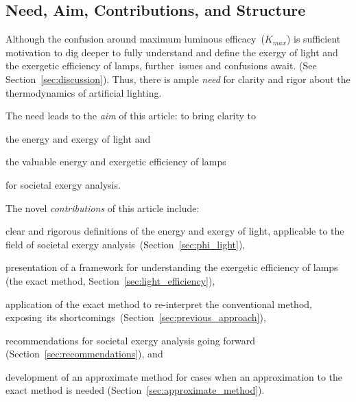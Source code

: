 \documentclass[energies,article,accept,moreauthors,pdftex]{Definitions/mdpi}\usepackage[]{graphicx}\usepackage[]{color}
\begin{document}
\subsection{Need, Aim, Contributions, and Structure}
\label{sec:aim_contribution_structure}

Although the confusion around maximum luminous efficacy~($K_{max}$)
is sufficient motivation to dig deeper to fully understand and define
the exergy of light and the exergetic efficiency of lamps, 
\mbox{further issues} and confusions await. 
(See Section~\ref{sec:discussion}).
Thus, there is ample \emph{need} for clarity and rigor 
about the thermodynamics of artificial lighting.

The need leads to the \emph{aim} of this article: 
to bring clarity to 
%
\begin{enumerate*}[label={(\alph*)}]

  \item the energy and exergy of light and        

  \item the valuable energy and exergetic efficiency of lamps

\end{enumerate*}
%
for societal exergy analysis.

The novel \emph{contributions} of this article include:
%
\begin{enumerate*}[label={(\alph*)}]

  \item clear and rigorous definitions of the energy and exergy of light, 
        applicable to the field of
        societal exergy analysis~(Section~\ref{sec:phi_light}),

  \item presentation of a framework for understanding 
        the exergetic efficiency of lamps
        (the exact method, Section~\ref{sec:light_efficiency}),

  \item application of the exact method to re-interpret the conventional method,
        \mbox{exposing its} shortcomings~(Section~\ref{sec:previous_approach}),

  \item recommendations for societal exergy analysis going forward (Section~\ref{sec:recommendations}), and 

  \item development of an approximate method for cases when an approximation to the exact method is needed
        (Section~\ref{sec:approximate_method}).

\end{enumerate*}
\end{document}
